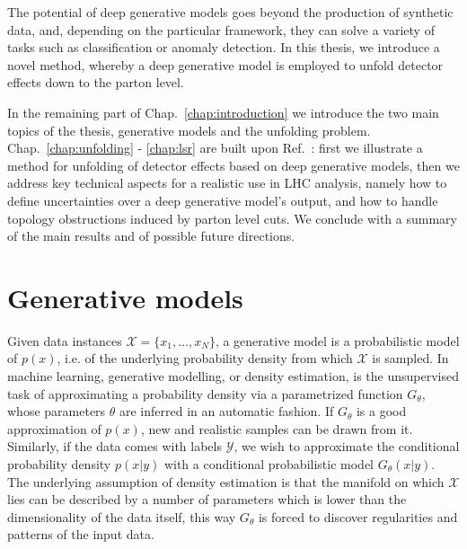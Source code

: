 The potential of deep generative models goes beyond the production of synthetic data, and, depending on the particular framework, they can solve a variety of tasks such as classification or anomaly detection. In this thesis, we introduce a novel method, whereby a deep generative model is employed to unfold detector effects down to the parton level.

In the remaining part of Chap.~\ref{chap:introduction} we introduce the two main topics of the thesis, generative models and the unfolding problem. Chap.~\ref{chap:unfolding} - \ref{chap:lsr} are built upon Ref.~\cite{cond_gan, Bellagente:2020piv, Bellagente:2021yyh, LSR}: first we illustrate a method for unfolding of detector effects based on deep generative models, then we address key technical aspects for a realistic use in LHC analysis, namely how to define uncertainties over a deep generative model's output, and how to handle topology obstructions induced by parton level cuts. We conclude with a summary of the main results and of possible future directions.

\section{Generative models}\label{sec:gmm}
Given data instances $\mathcal{X} = \{ x_1, \ldots , x_N \}$, a generative model is a probabilistic model of $p(x)$, i.e. of the underlying probability density from which $\mathcal{X}$ is sampled. 
In machine learning, generative modelling, or density estimation, is the unsupervised task of approximating a probability density via a parametrized function $G_{\theta}$, whose parameters $\theta$ are inferred in an automatic fashion. If $G_{\theta}$ is a good approximation of $p(x)$, new and realistic samples can be drawn from it.
Similarly, if the data comes with labels $\mathcal{Y}$, we wish to approximate the conditional probability density $p(x | y)$ with a conditional probabilistic model $G_{\theta}(x | y)$.
The underlying assumption of density estimation is that the manifold on which $\mathcal{X}$ lies can be described by a number of parameters which is lower than the dimensionality of the data itself, this way $G_{\theta}$ 
is forced to discover regularities and patterns of the input data.

